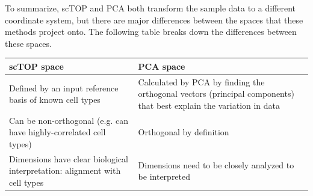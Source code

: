 \documentclass[12pt,american]{scrartcl}
\begin{document}
\begin{revresponse}
\begin{changes}
          To summarize, scTOP and PCA both transform the sample data to a different coordinate system, but there are major differences between the spaces that these methods project onto. The following table breaks down the differences between these spaces.

          \begin{tabular}{ |p{2.5in}|p{2.5in}|} 
             \hline
             scTOP space & PCA space\\ 
             \hline
             \hline
             Defined by an input reference basis of known cell types & Calculated by PCA by finding the orthogonal vectors (principal components) that best explain the variation in data  \\ 
             \hline
             Can be non-orthogonal (e.g. can have highly-correlated cell types) & Orthogonal by definition  \\ 
             \hline
             Dimensions have clear biological interpretation: alignment with cell types & Dimensions need to be closely analyzed to be interpreted \\
             \hline
         \end{tabular}
	\end{changes}
\end{revresponse}
\end{document}
